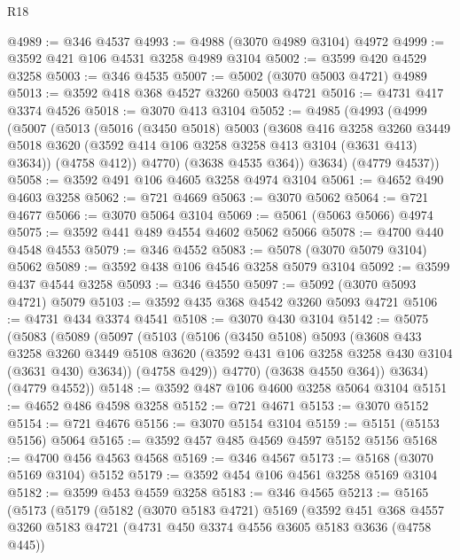 \begin{lexlean}{R18}
\begin{coremodule}
@4989 := @346 @4537
@4993 := @4988 (@3070 @4989 @3104) @4972
@4999 := @3592 @421 @106 @4531 @3258 @4989 @3104
@5002 := @3599 @420 @4529 @3258
@5003 := @346 @4535
@5007 := @5002 (@3070 @5003 @4721) @4989
@5013 := @3592 @418 @368 @4527 @3260 @5003 @4721
@5016 := @4731 @417 @3374 @4526
@5018 := @3070 @413 @3104
@5052 := @4985
    (@4993
      (@4999
        (@5007
          (@5013
            (@5016
              (@3450 @5018)
              @5003
              (@3608
                @416
                @3258
                @3260
                @3449
                @5018
                @3620
                (@3592 @414 @106 @3258 @3258 @413 @3104 (@3631 @413) @3634))
              (@4758 @412))
            @4770)
          (@3638 @4535 @364))
        @3634)
      (@4779 @4537))
@5058 := @3592 @491 @106 @4605 @3258 @4974 @3104
@5061 := @4652 @490 @4603 @3258
@5062 := @721 @4669
@5063 := @3070 @5062
@5064 := @721 @4677
@5066 := @3070 @5064 @3104
@5069 := @5061 (@5063 @5066) @4974
@5075 := @3592 @441 @489 @4554 @4602 @5062 @5066
@5078 := @4700 @440 @4548 @4553
@5079 := @346 @4552
@5083 := @5078 (@3070 @5079 @3104) @5062
@5089 := @3592 @438 @106 @4546 @3258 @5079 @3104
@5092 := @3599 @437 @4544 @3258
@5093 := @346 @4550
@5097 := @5092 (@3070 @5093 @4721) @5079
@5103 := @3592 @435 @368 @4542 @3260 @5093 @4721
@5106 := @4731 @434 @3374 @4541
@5108 := @3070 @430 @3104
@5142 := @5075
    (@5083
      (@5089
        (@5097
          (@5103
            (@5106
              (@3450 @5108)
              @5093
              (@3608
                @433
                @3258
                @3260
                @3449
                @5108
                @3620
                (@3592 @431 @106 @3258 @3258 @430 @3104 (@3631 @430) @3634))
              (@4758 @429))
            @4770)
          (@3638 @4550 @364))
        @3634)
      (@4779 @4552))
@5148 := @3592 @487 @106 @4600 @3258 @5064 @3104
@5151 := @4652 @486 @4598 @3258
@5152 := @721 @4671
@5153 := @3070 @5152
@5154 := @721 @4676
@5156 := @3070 @5154 @3104
@5159 := @5151 (@5153 @5156) @5064
@5165 := @3592 @457 @485 @4569 @4597 @5152 @5156
@5168 := @4700 @456 @4563 @4568
@5169 := @346 @4567
@5173 := @5168 (@3070 @5169 @3104) @5152
@5179 := @3592 @454 @106 @4561 @3258 @5169 @3104
@5182 := @3599 @453 @4559 @3258
@5183 := @346 @4565
@5213 := @5165
    (@5173
      (@5179
        (@5182
          (@3070 @5183 @4721)
          @5169
          (@3592
            @451
            @368
            @4557
            @3260
            @5183
            @4721
            (@4731 @450 @3374 @4556 @3605 @5183 @3636 (@4758 @445))

\end{coremodule}
\end{lexlean}

